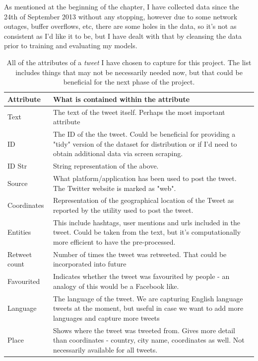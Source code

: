 \documentclass[minf,twoside,singlespacing,parskip,frontabs]{infthesis}
\begin{document}
As mentioned at the beginning of the chapter, I have collected data since the 24th of September 2013 without any stopping, however due to some network outages, buffer overflows, etc, there are some holes in the data, so it's not as consistent as I'd like it to be, but I have dealt with that by cleansing the data prior to training and evaluating my models. 


\begin{table}[]
\begin{center}
\begin{tabular}{ l | p{11cm} }
\textbf{Attribute} & \textbf{What is contained within the attribute} \\
\hline
\hline
Text & The text of the tweet itself. Perhaps the most important attribute \\
\hline
ID & The ID of the the tweet. Could be beneficial for providing a "tidy" version of the dataset for distribution or if I'd need to obtain additional data via screen scraping. \\
\hline
ID Str & String representation of the above. \\
\hline
Source & What platform/application has been used to post the tweet. The Twitter website is marked as "web". \\
\hline
Coordinates  & Representation of the geographical location of the Tweet as reported by the utility used to post the tweet. \\
\hline
Entities & This include hashtags, user mentions and urls included in the tweet. Could be taken from the text, but it's computationally more efficient to have the pre-processed. \\
\hline
Retweet count & Number of times the tweet was retweeted. That could be incorporated into future \\
\hline
Favourited & Indicates whether the tweet was favourited by people - an analogy of this would be a Facebook like.  \\
\hline
Language & The language of the tweet. We are capturing English language tweets at the moment, but useful in case we want to add more languages and capture more tweets\\
\hline
Place &  Shows where the tweet was tweeted from. Gives more detail than coordinates - country, city name, coordinates as well. Not necessarily available for all tweets. \\
\end{tabular}
\end{center}
\caption{All of the attributes of a \emph{tweet} I have chosen to capture for this project. The list includes things that may not be necessarily needed now, but that could be beneficial for the next phase of the project. }
\end{table}
\end{document}
